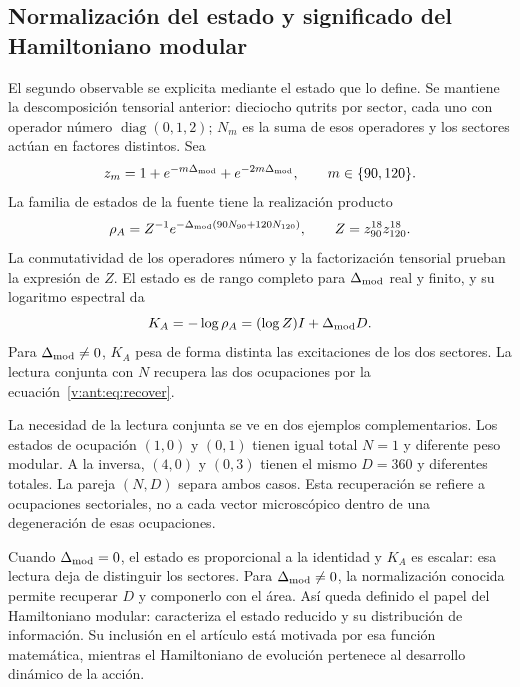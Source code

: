 \subsection{Normalización del estado y significado del Hamiltoniano modular}
El segundo observable se explicita mediante el estado que lo define.
Se mantiene la descomposición tensorial anterior: dieciocho qutrits
por sector, cada uno con operador número $\operatorname{diag}(0,1,2)$;
$N_m$ es la suma de esos operadores y los sectores actúan en factores
distintos. Sea
\[
 z_m=1+e^{-m\Delta_{\rm mod}}+e^{-2m\Delta_{\rm mod}},
 \qquad m\in\{90,120\}.
\]
La familia de estados de la fuente tiene la realización producto
\[
 \rho_A=Z^{-1}e^{-\Delta_{\rm mod}(90N_{90}+120N_{120})},
 \qquad Z=z_{90}^{18}z_{120}^{18}.
\]
La conmutatividad de los operadores número y la factorización tensorial
prueban la expresión de $Z$. El estado es de rango completo para
$\Delta_{\rm mod}$ real y finito, y su logaritmo espectral da
\[
 K_A=-\log\rho_A=(\log Z)I+\Delta_{\rm mod}D.
\]
Para $\Delta_{\rm mod}\ne0$, $K_A$ pesa de forma distinta las excitaciones
de los dos sectores. La lectura conjunta con $N$ recupera las dos ocupaciones
por la ecuación~\eqref{v:ant:eq:recover}.

La necesidad de la lectura conjunta se ve en dos ejemplos complementarios.
Los estados de ocupación $(1,0)$ y $(0,1)$ tienen igual total $N=1$
y diferente peso modular. A la inversa, $(4,0)$ y $(0,3)$ tienen
el mismo $D=360$ y diferentes totales. La pareja $(N,D)$ separa ambos
casos. Esta recuperación se refiere a ocupaciones sectoriales, no a
cada vector microscópico dentro de una degeneración de esas ocupaciones.

Cuando $\Delta_{\rm mod}=0$, el estado es proporcional a la identidad
y $K_A$ es escalar: esa lectura deja de distinguir los sectores.
Para $\Delta_{\rm mod}\ne0$, la normalización conocida permite recuperar
$D$ y componerlo con el área. Así queda definido el papel del Hamiltoniano
modular: caracteriza el estado reducido y su distribución de información.
Su inclusión en el artículo está motivada por esa función matemática,
mientras el Hamiltoniano de evolución pertenece al desarrollo dinámico
de la acción.
